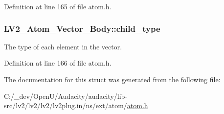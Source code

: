 Definition at line 165 of file atom.\+h.

\subsubsection[{\texorpdfstring{child\+\_\+type}{child_type}}]{ L\+V2\+\_\+\+Atom\+\_\+\+Vector\+\_\+\+Body\+::child\+\_\+type}\hypertarget{struct_l_v2___atom___vector___body_a934cee86cacc8555bc60e1e9adeae4a9}{}\label{struct_l_v2___atom___vector___body_a934cee86cacc8555bc60e1e9adeae4a9}
The type of each element in the vector. 

Definition at line 166 of file atom.\+h.



The documentation for this struct was generated from the following file\+:\begin{DoxyCompactItemize}
\item 
C\+:/\+\_\+dev/\+Open\+U/\+Audacity/audacity/lib-\/src/lv2/lv2/lv2/lv2plug.\+in/ns/ext/atom/\hyperlink{atom_8h}{atom.\+h}\end{DoxyCompactItemize}
